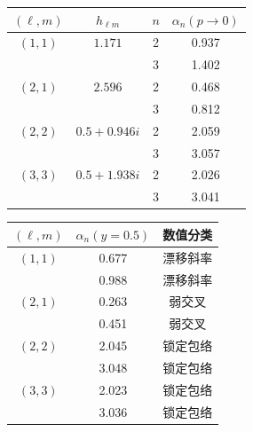 \documentclass[UTF8,fontset=fandol,11pt,a4paper,oneside]{ctexart}
\numberwithin{equation}{section}
\begin{document}
\noindent\begin{minipage}{\linewidth}
\captionsetup{type=table}\caption{历史高阶局域幂的模态层级和路径比较，待复核。}\label{audit:tab:power-modal}
\centering\fontsize{10}{13.5}\selectfont
\setlength{\tabcolsep}{6pt}\renewcommand{\arraystretch}{1.2}
\par{}\par\smallskip
\begin{tabular}{cccc}\toprule
$(\ell,m)$ & $h_{\ell m}$ & $n$ & $\alpha_n(p\to0)$\\\midrule
$(1,1)$ & $1.171$ & 2 & 0.937\\
 &  & 3 & 1.402\\
$(2,1)$ & $2.596$ & 2 & 0.468\\
 &  & 3 & 0.812\\
$(2,2)$ & $0.5+0.946i$ & 2 & 2.059\\
 &  & 3 & 3.057\\
$(3,3)$ & $0.5+1.938i$ & 2 & 2.026\\
 &  & 3 & 3.041\\
\bottomrule\end{tabular}
\par\medskip
\par{}\par\smallskip
\begin{tabular}{ccc}\toprule
$(\ell,m)$ & $\alpha_n(y=0.5)$ & 数值分类\\\midrule
$(1,1)$ & 0.677 & 漂移斜率\\
 & 0.988 & 漂移斜率\\
$(2,1)$ & 0.263 & 弱交叉\\
 & 0.451 & 弱交叉\\
$(2,2)$ & 2.045 & 锁定包络\\
 & 3.048 & 锁定包络\\
$(3,3)$ & 2.023 & 锁定包络\\
 & 3.036 & 锁定包络\\
\bottomrule\end{tabular}
\end{minipage}\par\addvspace{10pt}
\par\addvspace{14pt}
\end{document}
